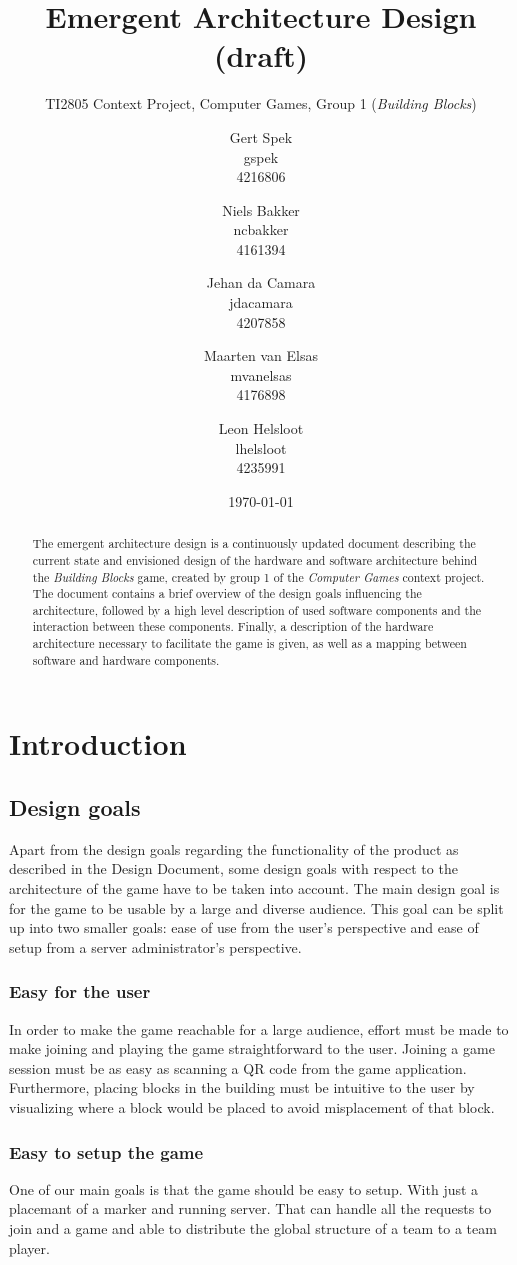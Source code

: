 \documentclass[a4paper,titlepage]{scrartcl}
\title{Emergent Architecture Design (draft)}
\subtitle{TI2805 Context Project, Computer Games, Group 1 (\textit{Building Blocks})}
\author{Gert Spek \\ gspek \\ 4216806 \and Niels Bakker \\ ncbakker \\ 4161394 \and Jehan da Camara \\ jdacamara \\ 4207858 \and Maarten van Elsas \\ mvanelsas \\ 4176898 \and Leon Helsloot \\ lhelsloot \\ 4235991}
\date{\today}
\begin{document}
\maketitle

\begin{abstract}
The emergent architecture design is a continuously updated document describing the current state and envisioned design of the hardware and software architecture behind the \textit{Building Blocks} game, created by group 1 of the \textit{Computer Games} context project. The document contains a brief overview of the design goals influencing the architecture, followed by a high level description of used software components and the interaction between these components. Finally, a description of the hardware architecture necessary to facilitate the game is given, as well as a mapping between software and hardware components.
\end{abstract}

\newpage
\tableofcontents

\section{Introduction}
\subsection{Design goals}
Apart from the design goals regarding the functionality of the product as described in the Design Document, some design goals with respect to the architecture of the game have to be taken into account. The main design goal is for the game to be usable by a large and diverse audience. This goal can be split up into two smaller goals: ease of use from the user's perspective and ease of setup from a server administrator's perspective.

\subsubsection{Easy for the user}
In order to make the game reachable for a large audience, effort must be made to make joining and playing the game straightforward to the user. Joining a game session must be as easy as scanning a QR code from the game application. Furthermore, placing blocks in the building must be intuitive to the user by visualizing where a block would be placed to avoid misplacement of that block.

\subsubsection{Easy to setup the game}
One of our main goals is that the game should be easy to setup. With just a placemant of a marker and running server. That can handle all the requests to join and a game and able to distribute the global structure of a team to a team player.
\end{document}
